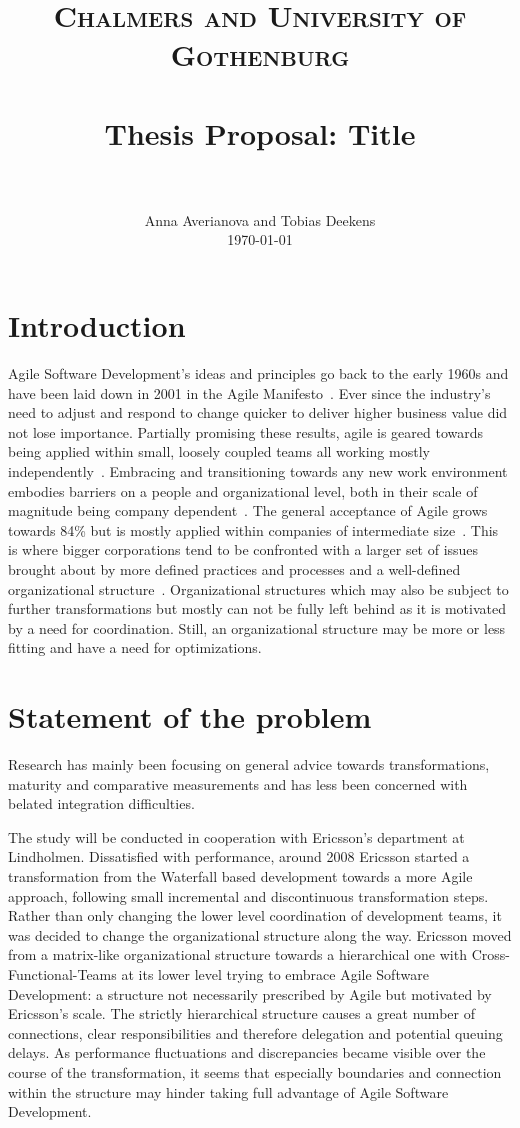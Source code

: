 \documentclass[paper=a4, fontsize=11pt]{scrartcl}
\title{
		\usefont{OT1}{bch}{b}{n}
		\normalfont \normalsize \textsc{Chalmers and University of Gothenburg} \\ [25pt]
		\horrule{0.5pt} \\[0.4cm]
		\huge Thesis Proposal: Title \\
		\horrule{2pt} \\[0.5cm]
}
\author{
		\normalfont 				                     \normalsize
      Anna Averianova and Tobias Deekens\\[-3pt]	\normalsize
      \today
}
\date{}
\numberwithin{equation}{section}		%
\numberwithin{figure}{section}			%
\numberwithin{table}{section}			%
\begin{document}
\maketitle

\section{Introduction}

Agile Software Development's ideas and principles go back to the early 1960s and have been laid down in 2001 in the Agile Manifesto~\citep{beck2001agile}. Ever since the industry's need to adjust and respond to change quicker to deliver higher business value did not lose importance. Partially promising these results, agile is geared towards being applied within small, loosely coupled teams all working mostly independently~\citep{stober2009agile}. Embracing and transitioning towards any new work environment embodies barriers on a people and organizational level, both in their scale of magnitude being company dependent~\citep{schiel2009enterprise}. The general acceptance of Agile grows towards 84\% but is mostly applied within companies of intermediate size~\citep{7thagilesur}. This is where bigger corporations tend to be confronted with a larger set of issues brought about by more defined practices and processes and a well-defined organizational structure~\citep{schiel2009enterprise}. Organizational structures which may also be subject to further transformations but mostly can not be fully left behind as it is motivated by a need for coordination. Still, an organizational structure may be more or less fitting and have a need for optimizations.

\section{Statement of the problem}

Research has mainly been focusing on general advice towards transformations, maturity and comparative measurements and has less been concerned with belated integration difficulties.

The study will be conducted in cooperation with Ericsson's department at Lindholmen. Dissatisfied with performance, around 2008 Ericsson started a transformation from the Waterfall based development towards a more Agile approach, following small incremental and discontinuous transformation steps. Rather than only changing the lower level coordination of development teams, it was decided to change the organizational structure along the way. Ericsson moved from a matrix-like organizational structure towards a hierarchical one with Cross-Functional-Teams at its lower level trying to embrace Agile Software Development: a structure not necessarily prescribed by Agile but motivated by Ericsson's scale.
The strictly hierarchical structure causes a great number of connections, clear responsibilities and therefore delegation and potential queuing delays. As performance fluctuations and discrepancies became visible over the course of the transformation, it seems that especially boundaries and connection within the structure may hinder taking full advantage of Agile Software Development.
\end{document}
